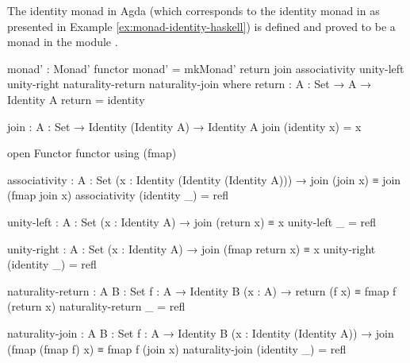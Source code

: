 \begin{example}
  \label{ex:monad-identity-agda}
  The identity monad in Agda (which corresponds to the identity monad
  in \hask as presented in Example \ref{ex:monad-identity-haskell}) is
  defined and proved to be a monad in the module
  .
  \begin{codeagda}
monad' : Monad' functor
monad' = mkMonad' return join associativity unity-left unity-right
                  naturality-return naturality-join
  where
    return : {A : Set} → A → Identity A
    return = identity

    join : {A : Set} → Identity (Identity A) → Identity A
    join (identity x) = x

    open Functor functor using (fmap)

    associativity : {A : Set} (x : Identity (Identity (Identity A))) →
                    join (join x) ≡ join (fmap join x)
    associativity (identity _) = refl

    unity-left : {A : Set} (x : Identity A) → join (return x) ≡ x
    unity-left _ = refl

    unity-right : {A : Set} (x : Identity A) → join (fmap return x) ≡ x
    unity-right (identity _) = refl

    naturality-return : {A B : Set} {f : A → Identity B} (x : A) →
                        return (f x) ≡ fmap f (return x)
    naturality-return _ = refl

    naturality-join : {A B : Set} {f : A → Identity B}
                      (x : Identity (Identity A)) →
                      join (fmap (fmap f) x) ≡ fmap f (join x)
    naturality-join (identity _) = refl
  \end{codeagda}
\end{example}

